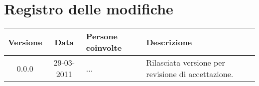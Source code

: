 \section*{Registro delle modifiche}

\begin{tabularx}{\textwidth}{|c|c|p{3.5cm}|X|}
 \hline \textbf{Versione} & \textbf{Data} & \textbf{Persone coinvolte} & \textbf{Descrizione} \\
 \hline 0.0.0 & 29-03-2011 & ... & Rilasciata versione per revisione di accettazione.\\
 \hline
\end{tabularx}
